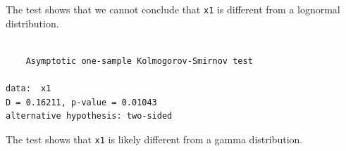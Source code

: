 \documentclass[
  13,
  letterpaper,
]{report}
\newenvironment{Shaded}{\begin{snugshade}}{\end{snugshade}}
\newcommand{\AttributeTok}[1]{\textcolor[rgb]{0.40,0.45,0.13}{#1}}
\newcommand{\DecValTok}[1]{\textcolor[rgb]{0.68,0.00,0.00}{#1}}
\newcommand{\FunctionTok}[1]{\textcolor[rgb]{0.28,0.35,0.67}{#1}}
\newcommand{\NormalTok}[1]{\textcolor[rgb]{0.00,0.23,0.31}{#1}}
\newcommand{\SpecialCharTok}[1]{\textcolor[rgb]{0.37,0.37,0.37}{#1}}
\newcommand{\StringTok}[1]{\textcolor[rgb]{0.13,0.47,0.30}{#1}}
\begin{document}
The test shows that we cannot conclude that \texttt{x1} is different
from a lognormal distribution.

\begin{Shaded}
\end{Shaded}

\begin{verbatim}

    Asymptotic one-sample Kolmogorov-Smirnov test

data:  x1
D = 0.16211, p-value = 0.01043
alternative hypothesis: two-sided
\end{verbatim}

The test shows that \texttt{x1} is likely different from a gamma
distribution.
\end{document}
